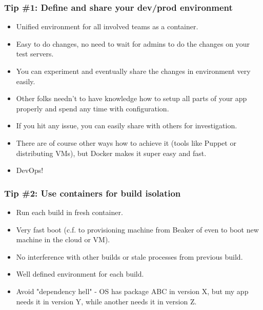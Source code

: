 \documentclass[10pt,utf8]{beamer}
\begin{document}
\begin{frame}
	\frametitle{Tip \#1: Define and share your dev/prod environment}
	\begin{itemize}
		\item Unified environment for all involved teams as a container.
		\item Easy to do changes, no need to wait for admins to do the changes on your test servers.
		\item You can experiment and eventually share the changes in environment very easily.
		\item Other folks needn't to have knowledge how to setup all parts of your app properly and spend any time with configuration.
		\item If you hit any issue, you can easily share with others for investigation.
		\item There are of course other ways how to achieve it (tools like Puppet or distributing VMs), but Docker makes it super easy and fast.
		\item DevOps!
	\end{itemize}
\end{frame}

\begin{frame}
	\frametitle{Tip \#2: Use containers for build isolation}
	\begin{itemize}
		\item Run each build in fresh container.
		\item Very fast boot (c.f. to provisioning machine from Beaker of even to boot new machine in the cloud or VM).
		\item No interference with other builds or stale processes from previous build.
		\item Well defined environment for each build.
		\item Avoid "dependency hell" - OS has package ABC in version X, but my app needs it in version Y, while another needs it in version Z.
	\end{itemize}
\end{frame}
\end{document}
